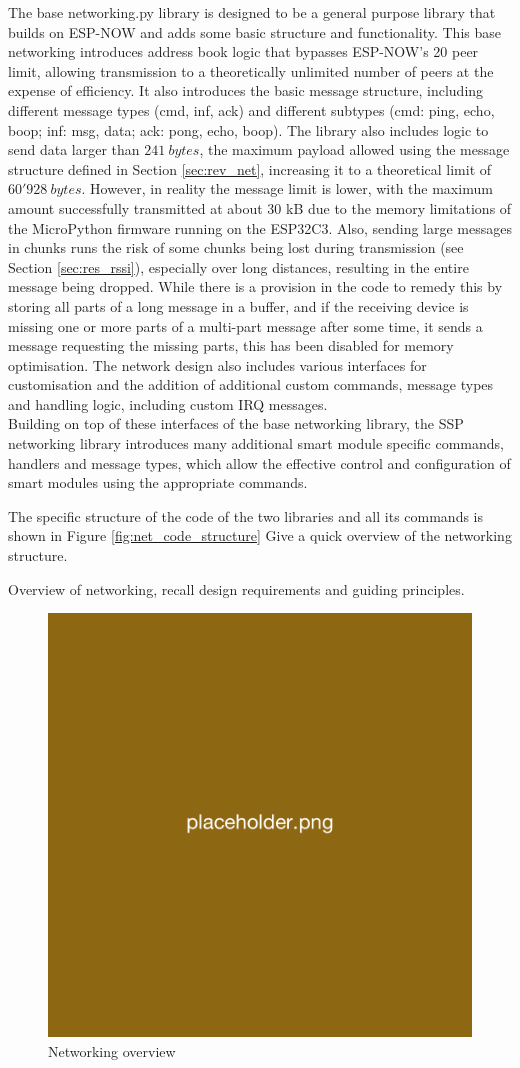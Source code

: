 The base networking.py library is designed to be a general purpose library that builds on ESP-NOW and adds some basic structure and functionality. This base networking introduces address book logic that bypasses ESP-NOW's 20 peer limit, allowing transmission to a theoretically unlimited number of peers at the expense of efficiency. It also introduces the basic message structure, including different message types (cmd, inf, ack) and different subtypes (cmd: ping, echo, boop; inf: msg, data; ack: pong, echo, boop). The library also includes logic to send data larger than $241\ bytes$, the maximum payload allowed using the message structure defined in Section \ref{sec:rev_net}, increasing it to a theoretical limit of $60'928\ bytes$. However, in reality the message limit is lower, with the maximum amount successfully transmitted at about 30 kB due to the memory limitations of the MicroPython firmware running on the ESP32C3. Also, sending large messages in chunks runs the risk of some chunks being lost during transmission (see Section \ref{sec:res_rssi}), especially over long distances, resulting in the entire message being dropped. While there is a provision in the code to remedy this by storing all parts of a long message in a buffer, and if the receiving device is missing one or more parts of a multi-part message after some time, it sends a message requesting the missing parts, this has been disabled for memory optimisation. 
The network design also includes various interfaces for customisation and the addition of additional custom commands, message types and handling logic, including custom IRQ messages. \\

Building on top of these interfaces of the base networking library, the SSP networking library introduces many additional smart module specific commands, handlers and message types, which allow the effective control and configuration of smart modules using the appropriate commands.

The specific structure of the code of the two libraries and all its commands is shown in Figure \ref{fig:net_code_structure}
Give a quick overview of the networking structure. 

Overview of networking, recall design requirements and guiding principles.

\begin{figure}[H]
    \centering
    \includegraphics[width=.5\linewidth]{overleaf/images/placeholder.png}
    \vspace{\ftspace}
    \caption{Networking overview}
    \label{fig:Networking overview}
\end{figure}


